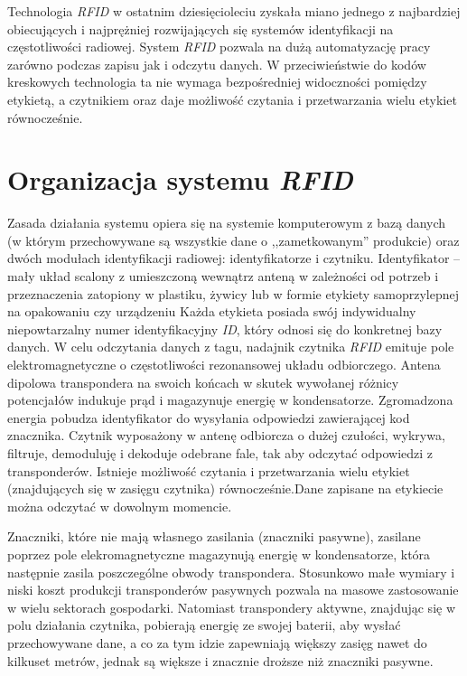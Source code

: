 \begin{itemize}
\begin{itemize}
\begin{itemize}
\end{itemize}

Technologia \emph{RFID} w ostatnim dziesięcioleciu zyskała miano jednego z najbardziej obiecujących i najprężniej rozwijających się systemów identyfikacji na częstotliwości radiowej.  System \emph{RFID} pozwala na dużą automatyzację pracy zarówno podczas zapisu jak i odczytu danych. W przeciwieństwie do kodów kreskowych technologia ta nie wymaga bezpośredniej widoczności pomiędzy etykietą, a czytnikiem oraz daje możliwość czytania i przetwarzania wielu etykiet równocześnie.

\section{Organizacja systemu \emph{RFID}}

Zasada działania systemu opiera się na systemie komputerowym z bazą danych (w którym przechowywane  są wszystkie dane o ,,zametkowanym” produkcie)  oraz dwóch modułach identyfikacji radiowej: identyfikatorze i czytniku. Identyfikator – mały układ scalony z umieszczoną wewnątrz anteną w zależności od potrzeb i przeznaczenia zatopiony w plastiku, żywicy lub w formie etykiety samoprzylepnej na opakowaniu czy urządzeniu Każda etykieta posiada swój indywidualny niepowtarzalny numer identyfikacyjny \emph{ID}, który odnosi się do konkretnej bazy danych. W celu odczytania danych z tagu, nadajnik czytnika \emph{RFID} emituje pole elektromagnetyczne o częstotliwości rezonansowej układu odbiorczego. Antena dipolowa transpondera na  swoich końcach w skutek wywołanej różnicy  potencjałów indukuje prąd i magazynuje energię w kondensatorze.  Zgromadzona energia pobudza identyfikator do wysyłania odpowiedzi zawierającej kod znacznika. 
Czytnik wyposażony w antenę odbiorcza o dużej czułości, wykrywa, filtruje, demoduluję i dekoduje odebrane fale, tak aby odczytać odpowiedzi z transponderów.
Istnieje możliwość czytania i przetwarzania wielu etykiet (znajdujących się w zasięgu czytnika) równocześnie.Dane zapisane na etykiecie można odczytać w dowolnym momencie. 

Znaczniki, które nie  mają własnego zasilania (znaczniki pasywne), zasilane poprzez pole elekromagnetyczne magazynują energię w kondensatorze, która następnie zasila poszczególne obwody transpondera. Stosunkowo małe wymiary i niski koszt  produkcji transponderów pasywnych pozwala na masowe zastosowanie w wielu sektorach gospodarki. Natomiast transpondery aktywne, znajdując się w polu działania czytnika, pobierają energię ze swojej baterii, aby wysłać przechowywane dane, a co za tym idzie zapewniają większy zasięg nawet do kilkuset metrów, jednak są większe i znacznie droższe niż znaczniki pasywne.


\end{itemize}
\end{itemize}
